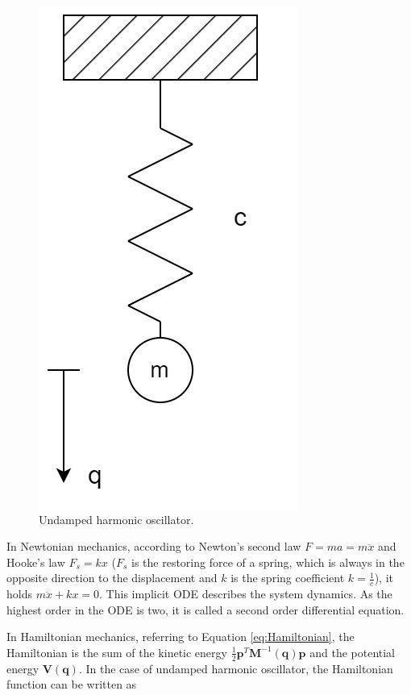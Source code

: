 \documentclass[
	parskip, 			   %
	twoside, 			   %
	DIV=14, 			   %
	BCOR=15.0mm, 		   %
	headsepline, 		   %
	open=right, 		   %
	captions=tableheading, %
	bibliography=totoc,    %
	numbers=noenddot       %
]{scrreprt}
\begin{document}
\clearpage
\begin{figure}[h!]
    \centering
    \includegraphics[scale=0.3]{figures/undamped harmonic oscillator.jpg}
    \caption{Undamped harmonic oscillator.}
    \label{fig:physical_model_undamped_harmonic_oscillator}
\end{figure}

In Newtonian mechanics, according to Newton's second law $F=ma=m\ddot{x}$ and Hooke's law $F_s=kx$ ($F_s$ is the restoring force of a spring, which is always in the opposite direction to the displacement and $k$ is the spring coefficient $k=\frac{1}{c}$), it holds $m\ddot{x}+kx=0$. This implicit ODE describes the system dynamics. As the highest order in the ODE is two, it is called a second order differential equation.

In Hamiltonian mechanics, referring to Equation \ref{eq:Hamiltonian}, the Hamiltonian is the sum of the kinetic energy $\frac{1}{2}\mathbf{p}^T\mathbf{M}^{-1}(\mathbf{q})\mathbf{p}$ and the potential energy $\mathbf{V}(\mathbf{q})$. In the case of undamped harmonic oscillator, the Hamiltonian function can be written as
\end{document}
